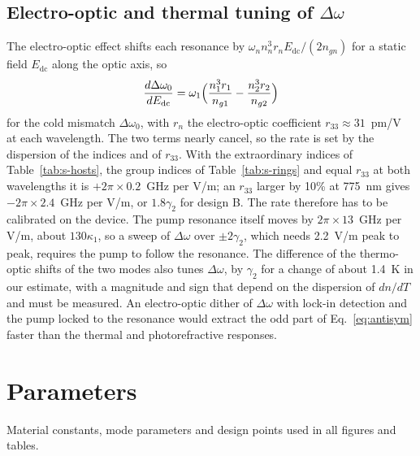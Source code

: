 \documentclass[9pt]{osa-supplemental-document}
\newcommand{\Dom}{\Delta\omega}
\begin{document}
\subsection{Electro-optic and thermal tuning of \texorpdfstring{$\Dom$}{the mismatch}}

The electro-optic effect shifts each resonance by
$\omega_nn_n^3r_nE_{\mathrm{dc}}/(2n_{gn})$ for a static field
$E_{\mathrm{dc}}$ along the optic axis, so
\begin{equation}
  \frac{d\Dom_0}{dE_{\mathrm{dc}}}=\omega_1\Bigl(\frac{n_1^3r_1}{n_{g1}}-\frac{n_2^3r_2}{n_{g2}}\Bigr)
\end{equation}
for the cold mismatch $\Dom_0$,
with $r_n$ the electro-optic coefficient $r_{33}\approx31$~pm/V~\cite{weis1985}
at each wavelength.  The two terms nearly cancel, so the rate is set by
the dispersion of the indices and of $r_{33}$.  With the extraordinary
indices of Table~\ref{tab:s-hosts}, the group indices of
Table~\ref{tab:s-rings} and equal $r_{33}$ at both wavelengths it is
$+2\pi\times0.2$~GHz per V/\textmu m; an $r_{33}$ larger by 10\% at 775~nm
gives $-2\pi\times2.4$~GHz per V/\textmu m, or $1.8\gamma_2$ for design B.
The rate therefore has to be calibrated on the device.  The pump
resonance itself moves by $2\pi\times13$~GHz per V/\textmu m, about
$130\kappa_1$, so a sweep of $\Dom$ over $\pm2\gamma_2$, which needs
2.2~V/\textmu m peak to peak, requires the pump to follow the resonance.
The difference of the thermo-optic shifts of the two modes also tunes
$\Dom$, by $\gamma_2$ for a change of about 1.4~K in our estimate, with a
magnitude and sign that depend on the dispersion of $dn/dT$ and must be
measured.  An electro-optic dither of $\Dom$ with
lock-in detection and the pump locked to the resonance would extract the
odd part of Eq.~\eqref{eq:antisym} faster than the thermal and photorefractive
responses.

\section{Parameters}

Material constants, mode parameters and design points used in all figures
and tables.


\end{document}
